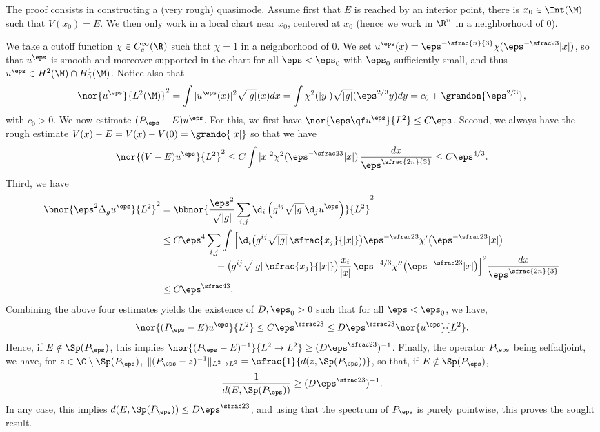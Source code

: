 \bnp
The proof consists in constructing a (very rough) quasimode.
Assume first that $E$ is reached by an interior point, \ie there is $x_0 \in \Int(\M)$ such that $V(x_0) = E$.
We then only work in a local chart near $x_0$, centered at $x_0$ (hence we work in $\R^n$ in a neighborhood of $0$).

We take a cutoff function $\chi \in C^\infty_c(\R)$ such that $\chi = 1$ in a neighborhood of $0$. We set
$u^\eps (x) = \eps^{-\sfrac{n}{3}} \chi( \eps^{-\sfrac23} |x|)$, so that $u^\eps$ is smooth and moreover supported in the chart for all $\eps<\eps_0$ with $\eps_0$ sufficiently small, and thus $u^\eps \in H^2(\M) \cap H^1_0(\M)$. Notice also that
\[
\nor{u^\eps}{L^2(\M)}^2 = \int |u^\eps(x)|^2 \sqrt{|g|}(x) dx = \int \chi^2(|y|) \sqrt{|g|}(\eps^{2/3} y) dy = c_0+ \grandon{\eps^{2/3}},
\]
with $c_0>0$.
We now estimate $(P_\eps - E)u^\eps$.
For this, we first have $\nor{\eps \qf u^\eps }{L^2} \leq C \eps$. Second, we always have the rough estimate $V(x)-E = V(x)-V(0) = \grando{|x|}$ so that we have
\begin{equation}
\label{e:quasim-est-1}
\nor{ (V-E) u^\eps }{L^2}^2 \leq C \int |x|^2 \chi^2( \eps^{-\sfrac23} |x|)\, \frac{dx}{ \eps^{\sfrac{2n}{3}}} \leq C \eps^{4/3}.
\end{equation}
Third, we have
\begin{align}
\label{e:quasim-est-2}
\bnor{\eps^2 \Delta_g u^\eps }{L^2}^2& = \bbnor{\frac{\eps^2}{\sqrt{|g|}}\sum_{i,j} \d_i \left(g^{ij} \sqrt{|g|} \d_j u^\eps \right) }{L^2}^2 \nonumber \\
& \leq C\eps^4 \sum_{i,j} \int \Big[\d_i \bigl(g^{ij} \sqrt{|g|}\, \sfrac{x_j}{|x|} \bigr) \eps^{-\sfrac23}\chi'\bigl( \eps^{-\sfrac23}|x|\bigr) \nonumber \\[
-5pt]
& \hspace*{2cm} + \bigl(g^{ij} \sqrt{|g|}\, \sfrac{x_j}{|x|} \bigr) \frac{x_i}{|x|}\, \eps^{-4/3} \chi'' \bigl( \eps^{-\sfrac23} |x| \bigr) \Big]^{2} \frac{dx}{ \eps^{\sfrac{2n}{3}}} \nonumber \\
& \leq C \eps^{\sfrac43}.
\end{align}
Combining the above four estimates yields the existence of $D,\eps_0>0$ such that for all $\eps<\eps_0$, we have,
\[
\nor{(P_\eps - E) u^\eps}{L^2} \leq C \eps^{\sfrac23} \leq D\eps^{\sfrac23} \nor{u^\eps}{L^2}.
\]
Hence, if $E \notin \Sp(P_\eps)$, this implies $\nor{(P_\eps - E)^{-1}}{L^2\to L^2}\geq (D\eps^{\sfrac23})^{-1}$.
Finally, the operator $P_\eps$ being selfadjoint, we have, for $z \in \C \setminus \Sp(P_\eps)$, $\|(P_\eps-z)^{-1}\|_{L^2\to L^2} = \sfrac{1}{d(z, \Sp(P_\eps))}$, so that, if $E \notin \Sp(P_\eps)$,
\[
\frac{1}{d(E, \Sp(P_\eps))} \geq (D\eps^{\sfrac23})^{-1}.
\]
In any case, this implies $d(E, \Sp(P_\eps))\leq D\eps^{\sfrac23}$, and using that the spectrum of $P_\eps$ is purely pointwise, this proves the sought result.

